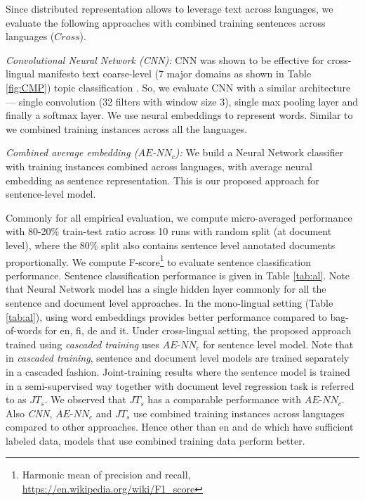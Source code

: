 \documentclass[11pt,a4paper]{article}
\begin{document}
Since distributed representation allows to leverage text across languages, we evaluate the following approaches with combined training sentences across languages ($Cross$).

\begin{description}
\item{\textit{Convolutional Neural Network (CNN):}} CNN was shown to be effective for cross-lingual manifesto text coarse-level (7 major domains as shown in Table \ref{fig:CMP}) topic classification \cite{W17-2906}. So, we evaluate CNN with a similar architecture --- single convolution (32 filters with window size 3), single max pooling layer and finally a softmax layer. We use neural embeddings to represent words. Similar to \cite{W17-2906} we combined training instances across all the languages.
\item{\textit{Combined average embedding ($AE$-$NN_{c}$):}} We build a Neural Network classifier with training instances combined across languages, with average neural embedding as sentence representation. This is our proposed approach for sentence-level model.
\end{description}

Commonly for all empirical evaluation, we compute micro-averaged performance with 80-20\% train-test ratio across 10 runs with random split (at document level), where the 80\% split also contains sentence level annotated documents proportionally.  We compute F-score\footnote{Harmonic mean of precision and recall, \url{https://en.wikipedia.org/wiki/F1_score}} to evaluate sentence classification performance. Sentence classification performance is given in Table \ref{tab:al}. Note that Neural Network model has a single hidden layer commonly for all the sentence and document level approaches. In the mono-lingual setting (Table \ref{tab:al}), using word embeddings provides better performance compared to bag-of-words for en, fi, de and it. Under cross-lingual setting, the proposed approach trained using \textit{cascaded training} uses $AE$-$NN_{c}$ for sentence level model. Note that in \textit{cascaded training}, sentence and document level models are trained separately in a cascaded fashion. Joint-training results where the sentence model is trained in a semi-supervised way together with document level regression task is referred to as \textit{$JT_{s}$}.  We observed that $JT_{s}$ has a comparable performance with $AE$-$NN_{c}$. Also \textit{CNN}, $AE$-$NN_{c}$ and \textit{$JT_{s}$} use combined training instances across languages compared to other approaches. Hence other than en and de which have sufficient labeled data, models that use combined training data perform better. %
\end{document}

